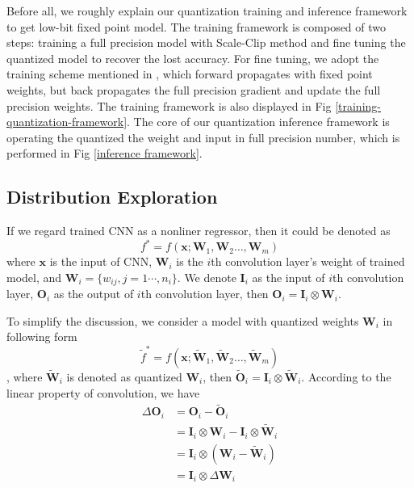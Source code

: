 \documentclass[letterpaper]{article} %
\begin{document}
Before all, we roughly explain our quantization training and inference framework to get low-bit fixed point model.
The training framework is composed of two steps: training a full precision model with Scale-Clip method and 
fine tuning the quantized model to recover the lost accuracy.
For fine tuning, we adopt the training scheme mentioned in \cite{gysel2016ristretto,polino2018model}, which forward propagates with fixed point weights, but back propagates the full precision gradient and update the full precision weights.
The training framework is also displayed in Fig \ref{training-quantization-framework}.
The core of our quantization inference framework is operating the quantized the weight and input in full precision number, 
which is performed in Fig \ref{inference framework}.

\subsection{Distribution Exploration}
If we regard trained CNN as a nonliner regressor, then it could be denoted as 
\begin{equation}
f^{*}=f(\mathbf{x};\mathbf{W}_1,\mathbf{W}_2\dots,\mathbf{W}_m)
\end{equation}
where $\mathbf{x}$ is the input of CNN, $\mathbf{W}_{i}$ is the $i$th convolution layer's weight of trained model,
and $\mathbf{W}_{i}=\{w_{ij},j=1\cdots,n_i\}$.
We denote $\mathbf{I}_i$ as the input of $i$th convolution layer, $\mathbf{O}_i$ as the output of $i$th convolution layer,
then $\mathbf{O}_i=\mathbf{I}_i\otimes \mathbf{W}_i$.

To simplify the discussion, we consider a model with quantized weights $\mathbf{W}_{i}$
in following form
\begin{equation}
\tilde{f}^{*}=f(\mathbf{x};\tilde{\mathbf{W}}_1,\tilde{\mathbf{W}}_2\dots,\tilde{\mathbf{W}}_m)
\end{equation},
where $\tilde{\mathbf{W}}_{i}$ is denoted as quantized $\mathbf{W}_{i}$, then $\tilde{\mathbf{O}}_i=\mathbf{I}_i\otimes \tilde{\mathbf{W}}_i$. 
According to the linear property of convolution, we have 
\begin{equation}
	\begin{aligned}
	\Delta \mathbf{O}_{i} &=\mathbf{O}_i-\tilde{\mathbf{O}}_i\\
	&=\mathbf{I}_i \otimes \mathbf{W}_i-\mathbf{I}_i\otimes \tilde{\mathbf{W}}_i\\
	&=\mathbf{I}_i\otimes(\mathbf{W}_{i}-\tilde{\mathbf{W}}_i)\\
	&=\mathbf{I}_i\otimes \Delta \mathbf{W}_{i}
	\end{aligned}
\end{equation}
\end{document}
